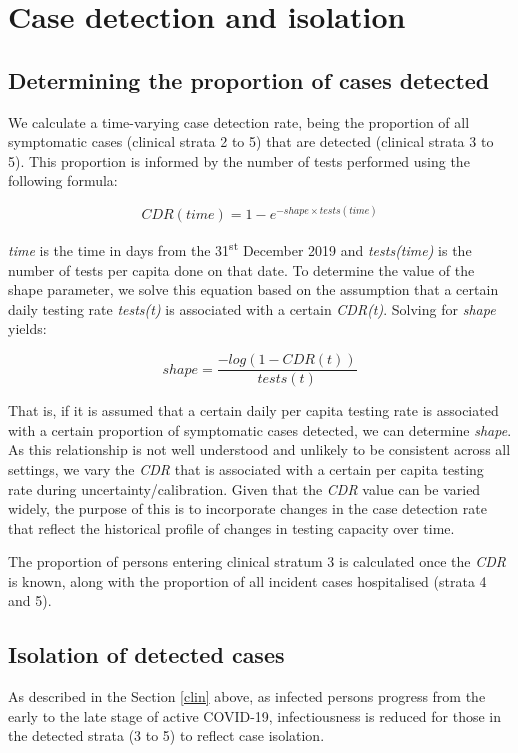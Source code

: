 \section{Case detection and isolation} \label{cdr}

\subsection{Determining the proportion of cases detected}
We calculate a time-varying case detection rate, being the proportion of all symptomatic cases (clinical strata 2 to 5) that are detected (clinical strata 3 to 5). This proportion is informed by the number of tests performed using the following formula:

\[CDR(time)=1-e^{-shape \times tests(time)}\]

\textit{time} is the time in days from the 31\textsuperscript{st} December 2019 and \textit{tests(time)} is the number of tests per capita done on that date. To determine the value of the shape parameter, we solve this equation based on the assumption that a certain daily testing rate \textit{tests(t)} is associated with a certain \textit{CDR(t)}. Solving for \textit{shape} yields:

\[shape = \frac{-log(1 - CDR(t))}{tests(t)}\]

That is, if it is assumed that a certain daily per capita testing rate is associated with a certain proportion of symptomatic cases detected, we can determine \textit{shape}.
As this relationship is not well understood and unlikely to be consistent across all settings, we vary the \textit{CDR} that is associated with a certain per capita testing rate during uncertainty/calibration.
Given that the \textit{CDR} value can be varied widely, the purpose of this is to incorporate changes in the case detection rate that reflect the historical profile of changes in testing capacity over time.

The proportion of persons entering clinical stratum 3 is calculated once the \textit{CDR} is known, along with the proportion of all incident cases hospitalised (strata 4 and 5).

\subsection{Isolation of detected cases}
As described in the Section \ref{clin} above, as infected persons progress from the early to the late stage of active COVID-19, infectiousness is reduced for those in the detected strata (3 to 5) to reflect case isolation.

